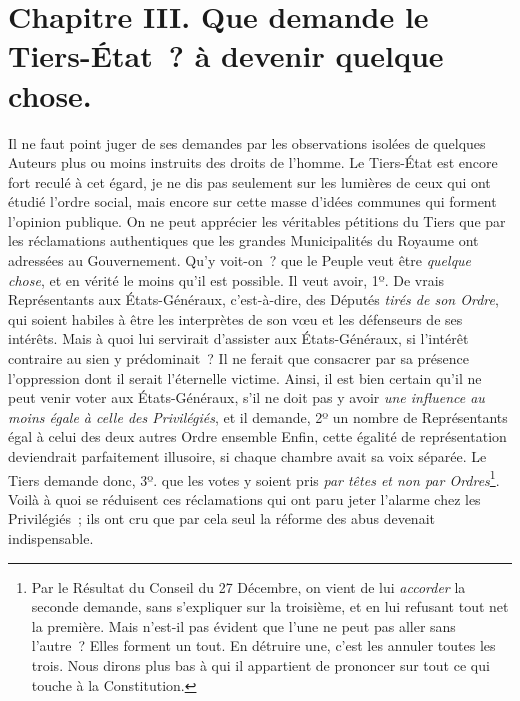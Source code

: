 \documentclass[french,twoside]{book} %
\newcommand\chapteropen{} %
\newcommand\chaptercont{} %
\newcommand\chapterclose{} %
\begin{document}
\chapterclose


\chapteropen
\chapter[{Chapitre III. Que demande le Tiers-État ? à devenir quelque chose.}]{Chapitre III. Que demande le Tiers-État ? à devenir quelque chose.}\renewcommand{\leftmark}{Chapitre III. Que demande le Tiers-État ? à devenir quelque chose.}


\chaptercont
\noindent Il ne faut point juger de ses demandes par les observations isolées de quelques Auteurs plus ou moins instruits des droits de l’homme. Le Tiers-État est encore fort reculé à cet égard, je ne dis pas seulement sur les lumières de ceux qui ont étudié l’ordre social, mais encore sur cette masse d’idées communes qui forment l’opinion publique. On ne peut apprécier les véritables pétitions du Tiers que par les réclamations authentiques que les grandes Municipalités du Royaume ont adressées au Gouvernement. Qu’y voit-on ? que le Peuple veut être {\itshape quelque chose}, et en vérité le moins qu’il est possible. Il veut avoir, 1º. De vrais Représentants aux États-Généraux, c’est-à-dire, des Députés {\itshape tirés de son Ordre}, qui soient habiles à être les interprètes de son vœu et les défenseurs de ses intérêts. Mais à quoi lui servirait d’assister aux États-Généraux, si l’intérêt contraire au sien y prédominait ? Il ne ferait que consacrer par sa présence l’oppression dont il serait l’éternelle victime. Ainsi, il est bien certain qu’il ne peut venir voter aux États-Généraux, s’il ne doit pas y avoir {\itshape une influence au moins égale à celle des Privilégiés}, et il demande, 2º un nombre de Représentants égal à celui des deux autres Ordre ensemble Enfin, cette égalité de représentation deviendrait parfaitement illusoire, si chaque chambre avait sa voix séparée. Le Tiers demande donc, 3º. que les votes y soient pris {\itshape par têtes et non par Ordres}\footnote{Par le Résultat du Conseil du 27 Décembre, on vient de lui {\itshape accorder} la seconde demande, sans s’expliquer sur la troisième, et en lui refusant tout net la première. Mais n’est-il pas évident que l’une ne peut pas aller sans l’autre ? Elles forment un tout. En détruire une, c’est les annuler toutes les trois. Nous dirons plus bas à qui il appartient de prononcer sur tout ce qui touche à la Constitution.}. Voilà à quoi se réduisent ces réclamations qui ont paru jeter l’alarme chez les Privilégiés ; ils ont cru que par cela seul la réforme des abus devenait indispensable.\par
\end{document}
